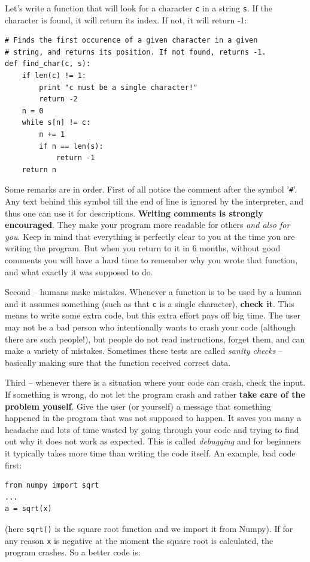 Let's write a function that will look for a character {\tt c} 
in a string {\tt s}. If the character is found, it will return its index. 
If not, it will return -1:

\begin{verbatim}
# Finds the first occurence of a given character in a given 
# string, and returns its position. If not found, returns -1. 
def find_char(c, s):
    if len(c) != 1: 
        print "c must be a single character!"
        return -2
    n = 0
    while s[n] != c:
        n += 1
        if n == len(s):
            return -1
    return n
\end{verbatim}
Some remarks are in order. First of all notice the comment after the 
symbol '{\tt \#}'. Any text behind this symbol till the end of line is ignored 
by the interpreter, and thus one can use it for descriptions. {\bf Writing 
comments is strongly encouraged}. They make your program more readable for others
{\em and also for you}. Keep in mind that everything is perfectly clear to you 
at the time you are writing the program. But when you return to it in 6 months, 
without good comments you will have a hard time to remember why you wrote that 
function, and what exactly it was supposed to do. 

Second -- humans make mistakes. Whenever a function is to be used by a human
and it assumes something (such as that {\tt c} is a single character), {\bf check
it}. This means to write some extra code, but this extra effort pays off big time.
The user may not be a bad person who intentionally wants to crash your 
code (although there are such people!), but people do not read instructions, 
forget them, and can make a variety 
of mistakes. Sometimes these tests are called {\em sanity checks} -- basically
making sure that the function received correct data.

Third -- whenever there is 
a situation where your code can crash, check the input. If something is wrong,
do not let the program crash and rather {\bf take care of the problem youself}. 
Give the user (or yourself) a message that something happened in the program that 
was not supposed 
to happen. It saves you many a headache and lots of time wasted by going through 
your code and trying to find out why it does not work as expected. This is called 
{\em debugging} and for beginners it typically takes more time than writing the 
code itself. An example, bad code first:

\begin{verbatim}
from numpy import sqrt
...
a = sqrt(x)
\end{verbatim}
(here {\tt sqrt()} is the square root function and we import it from Numpy). If
for any reason {\tt x} is negative at the moment the square root is calculated,
the program crashes. So a better code is:

